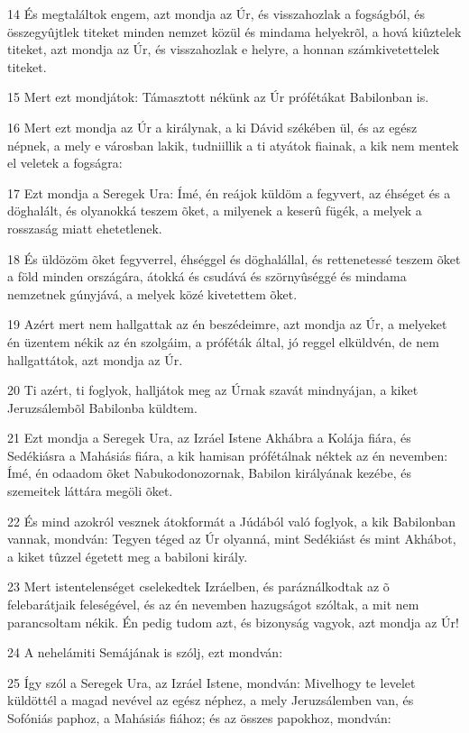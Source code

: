 \par 14 És megtaláltok engem, azt mondja az Úr, és visszahozlak a fogságból, és összegyûjtlek titeket minden nemzet közül és mindama helyekrõl, a hová kiûztelek titeket, azt mondja az Úr, és visszahozlak e helyre, a honnan számkivetettelek titeket.
\par 15 Mert ezt mondjátok: Támasztott nékünk az Úr prófétákat Babilonban is.
\par 16 Mert ezt mondja az Úr a királynak, a ki Dávid székében ül, és az egész népnek, a mely e városban lakik, tudniillik a ti atyátok fiainak, a kik nem mentek el veletek a fogságra:
\par 17 Ezt mondja a Seregek Ura: Ímé, én reájok küldöm a fegyvert, az éhséget és a döghalált, és olyanokká teszem õket, a milyenek a keserû fügék, a melyek a rosszaság miatt ehetetlenek.
\par 18 És üldözöm õket fegyverrel, éhséggel és döghalállal, és rettenetessé teszem õket a föld minden országára, átokká és csudává és szörnyûséggé és mindama nemzetnek gúnyjává, a melyek közé kivetettem õket.
\par 19 Azért mert nem hallgattak az én beszédeimre, azt mondja az Úr, a melyeket én üzentem nékik az én szolgáim, a próféták által, jó reggel elküldvén, de nem hallgattátok, azt mondja az Úr.
\par 20 Ti azért, ti foglyok, halljátok meg az Úrnak szavát mindnyájan, a kiket Jeruzsálembõl Babilonba küldtem.
\par 21 Ezt mondja a Seregek Ura, az Izráel Istene Akhábra a Kolája fiára, és Sedékiásra a Mahásiás fiára, a kik hamisan prófétálnak néktek az én nevemben: Ímé, én odaadom õket Nabukodonozornak, Babilon királyának kezébe, és szemeitek láttára megöli õket.
\par 22 És mind azokról vesznek átokformát a Júdából való foglyok, a kik Babilonban vannak, mondván: Tegyen téged az Úr olyanná, mint Sedékiást és mint Akhábot, a kiket tûzzel égetett meg a babiloni király.
\par 23 Mert istentelenséget cselekedtek Izráelben, és paráználkodtak az õ felebarátjaik feleségével, és az én nevemben hazugságot szóltak, a mit nem parancsoltam nékik. Én pedig tudom azt, és bizonyság vagyok, azt mondja az Úr!
\par 24 A nehelámiti Semájának is szólj, ezt mondván:
\par 25 Így szól a Seregek Ura, az Izráel Istene, mondván: Mivelhogy te levelet küldöttél a magad nevével az egész néphez, a mely Jeruzsálemben van, és Sofóniás paphoz, a Mahásiás fiához; és az összes papokhoz, mondván:

